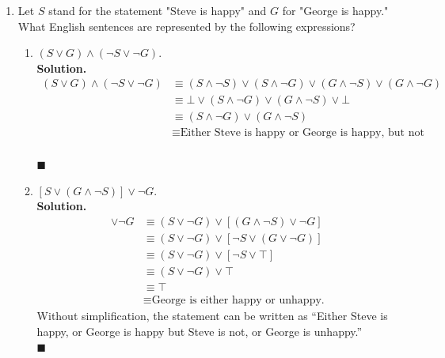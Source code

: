 \documentclass{report}
\newcommand{\sol}{\vspace{1em}\\\textbf{Solution.}\vspace{0.5em}}
\newcommand{\qed}{‎\\‎\hfill$\blacksquare$\vspace{1em}}
\begin{document}
\begin{enumerate}[leftmargin=*]
    \item Let $S$ stand for the statement "Steve is happy" and $G$ for "George is happy."
          What English sentences are represented by the following expressions?
          \begin{enumerate}
              \item $(S \vee G) \wedge(\neg S \vee \neg G)$. \sol{}
                    \begin{align*}
                        (S \vee G) \wedge(\neg S \vee \neg G) & \equiv (S \wedge \neg S) \vee (S \wedge \neg G) \vee (G \wedge \neg S) \vee (G \wedge \neg G) \\
                                                              & \equiv \bot \vee (S \wedge \neg G) \vee (G \wedge \neg S) \vee \bot                           \\
                                                              & \equiv (S \wedge \neg G) \vee (G \wedge \neg S)                                               \\
                                                              & \equiv \text{Either Steve is happy or George is happy, but not both.}
                    \end{align*} \qed

              \item $[S \vee(G \wedge \neg S)] \vee \neg G$. \sol{}
                    \begin{align*}
                        [S \vee(G \wedge \neg S)] \vee \neg G & \equiv (S \vee \neg G) \vee [(G \wedge \neg S) \vee \neg G] \\
                                                              & \equiv (S \vee \neg G) \vee [\neg S \vee (G \vee \neg G)]   \\
                                                              & \equiv (S \vee \neg G) \vee [\neg S \vee \top]              \\
                                                              & \equiv (S \vee \neg G) \vee \top                            \\
                                                              & \equiv \top                                                 \\
                                                              & \equiv \text{George is either happy or unhappy.}
                    \end{align*}
                    Without simplification, the statement can be written as ``Either Steve is happy, or George is happy but Steve is not, or George is unhappy.'' \qed


\end{enumerate}
\end{enumerate}
\end{document}
